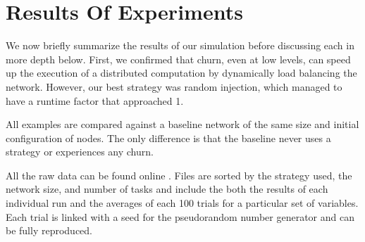 \documentclass[11pt,conference]{IEEEtran}
\begin{document}
\section{Results Of Experiments}
\label{sec:autonomous-results}

We now briefly summarize the results of our simulation before discussing each in more depth below.
First, we confirmed that churn, even at low levels, can speed up the execution of a distributed computation by dynamically load balancing the network.
However, our best strategy was random injection, which managed to have a runtime factor that approached 1.

All examples are compared against a baseline network of the same size and initial configuration of nodes. 
The only difference is that the baseline never uses a strategy or experiences any churn.

All the raw data can be found online \cite{simulation-data}.
Files are sorted by the strategy used, the network size,  and number of tasks and include the both the results of each individual run and the averages of each 100 trials for a particular set of variables.
Each trial is linked with a seed for the pseudorandom number generator and can be fully reproduced.
\end{document}

